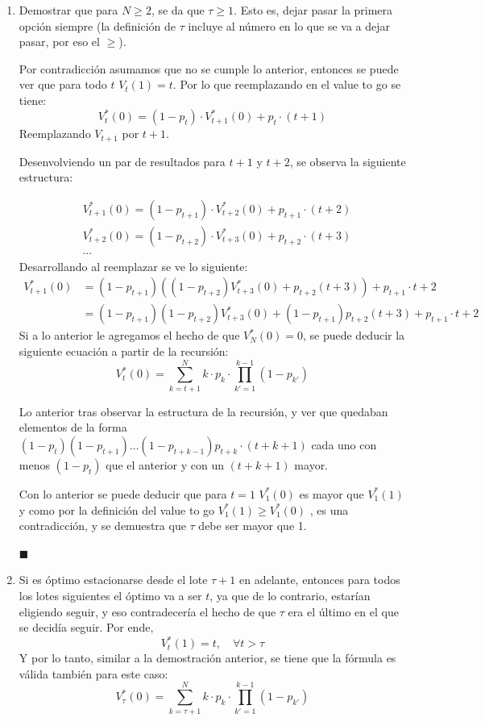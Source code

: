 \documentclass[letterpaper,10pt]{article}
\begin{document}
\begin{enumerate}
    \item Demostrar que para $N\geq2$, se da que $\tau\geq 1$. Esto es, dejar pasar la primera opción siempre (la definición de $\tau$ incluye al número en lo que se va a dejar pasar, por eso el $\geq$).
    
    Por contradicción asumamos que no se cumple lo anterior, entonces se puede ver que para todo $t$ $ V_t(1) = t$. Por lo que reemplazando en el value to go se tiene:
    $$V^*_t(0) = (1-p_t)\cdot V^*_{t+1}(0) + p_t \cdot (t+1)$$
    Reemplazando $V_{t+1}$ por $t+1$.
    
    Desenvolviendo un par de resultados para $t+1$ y $t+2$, se observa la siguiente estructura:
    
    \begin{align*}
        &V^*_{t+1}(0) = (1-p_{t+1})\cdot V^*_{t+2}(0) + p_{t+1} \cdot (t+2)\\
        &V^*_{t+2}(0) = (1-p_{t+2})\cdot V^*_{t+3}(0) + p_{t+2} \cdot (t+3)\\
        &\cdots
    \end{align*}
    Desarrollando al reemplazar se ve lo siguiente:
    \begin{align*}
        V^*_{t+1}(0) &= (1-p_{t+1}) ((1-p_{t+2}) V^*_{t+3}(0) + p_{t+2} (t+3))  + p_{t+1} \cdot t+2\\
        &= (1-p_{t+1})(1-p_{t+2}) V^*_{t+3}(0) + (1-p_{t+1}) p_{t+2} (t+3)  + p_{t+1} \cdot t+2
    \end{align*}
    Si a lo anterior le agregamos el hecho de que $V^*_N(0)=0$, se puede deducir la siguiente ecuación a partir de la recursión:
    $$V^*_t(0) = \sum_{k=t+1}^{N}k\cdot p_k \cdot \prod_{k'=1}^{k-1}(1-p_{k'})$$
    
    Lo anterior tras observar la estructura de la recursión, y ver que quedaban elementos de la forma $(1-p_t)(1-p_{t+1})\dots (1-p_{t+k-1}) p_{t+k} \cdot (t+k+1)$ cada uno con menos $(1-p_t)$ que el anterior y con un $(t+k+1)$ mayor.
    
    Con lo anterior se puede deducir que para $t=1$ $V^*_1(0)$ es mayor que $V^*_1(1)$ y como por la definición del value to go $V^*_1(1) \geq V^*_1(0)$ , es una contradicción, y se demuestra que $\tau$ debe ser mayor que 1.
    \begin{flushright} $\blacksquare$ \end{flushright}
    
    \item Si es óptimo estacionarse desde el lote $\tau + 1$ en adelante, entonces para todos los lotes siguientes el óptimo va a ser $t$, ya que de lo contrario, estarían eligiendo seguir, y eso contradecería el hecho de que $\tau$ era el último en el que se decidía seguir.
    Por ende, $$V^*_{t}(1) = t, \quad \forall t > \tau$$
    Y por lo tanto, similar a la demostración anterior, se tiene que la fórmula  es válida también para este caso:
    $$V^*_\tau(0) = \sum_{k=\tau+1}^{N}k\cdot p_k \cdot \prod_{k'=1}^{k-1}(1-p_{k'})$$
    

\end{enumerate}
\end{document}
